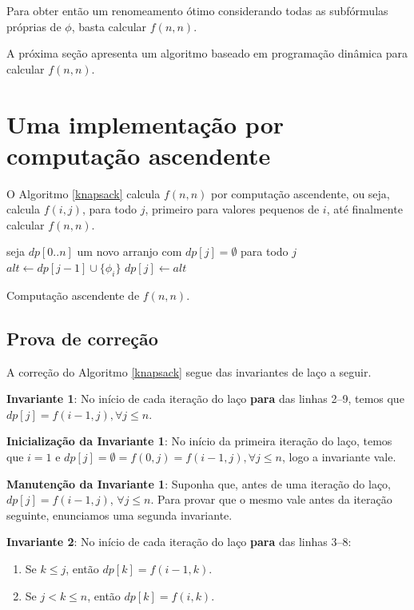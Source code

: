 Para obter então um renomeamento ótimo considerando todas as subfórmulas próprias de $\phi$, basta calcular $f(n,n)$.

A próxima seção apresenta um algoritmo baseado em programação dinâmica \cite{bellman2015applied} para calcular $f(n,n)$.

\section{Uma implementação por computação ascendente}

\indent

O Algoritmo \ref{knapsack} calcula $f(n,n)$ por computação ascendente, ou seja, calcula $f(i,j)$, para todo $j$, primeiro para valores pequenos de $i$, até finalmente calcular $f(n,n)$.

\begin{algorithm}
	\begin{algorithmic}[1]
		\State seja $dp[0..n]$ um novo arranjo com $dp[j] = \emptyset$ para todo $j$
				\State $alt \gets dp[j-1] \cup \{\phi_i\}$
					\State $dp[j] \gets alt$
				\EndIf
			\EndFor
		\EndFor
	\end{algorithmic}
	\caption{Computação ascendente de $f(n,n)$.}
	\label{knapsack}
\end{algorithm}

\subsection{Prova de correção}

\indent

A correção do Algoritmo \ref{knapsack} segue das invariantes de laço a seguir.

\textbf{Invariante 1}: No início de cada iteração do laço \textbf{para} das linhas 2--9, temos que $dp[j] = f(i-1,j), \forall j \leq n$.

\textbf{Inicialização da Invariante 1}: No início da primeira iteração do laço, temos que $i = 1$ e $dp[j] = \emptyset = f(0,j) = f(i-1,j), \forall j \leq n$, logo a invariante vale.

\textbf{Manutenção da Invariante 1}: Suponha que, antes de uma iteração do laço,\break $dp[j] = f(i-1,j)$, $\forall j \leq n$. Para provar que o mesmo vale antes da iteração seguinte, enunciamos uma segunda invariante.

\textbf{Invariante 2}: No início de cada iteração do laço \textbf{para} das linhas 3--8:
\begin{enumerate}
	\item Se $k \leq j$, então $dp[k] = f(i-1,k)$.
	\item Se $j < k \leq n$, então $dp[k] = f(i,k)$.
\end{enumerate}

